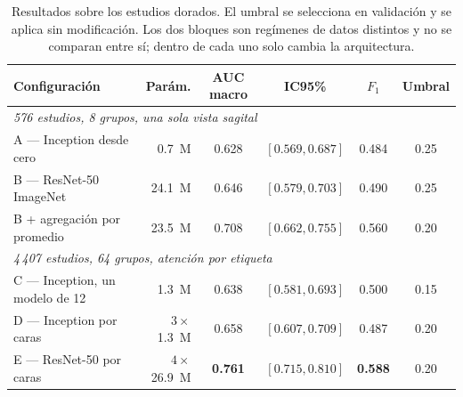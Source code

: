 \begin{table}[ht]
\centering
\caption{Resultados sobre los estudios dorados. El umbral se selecciona en
validación y se aplica sin modificación. Los dos bloques son regímenes de datos
distintos y no se comparan entre sí; dentro de cada uno solo cambia la
arquitectura.}
\label{tab:principal}
\begin{tabular}{lrcccc}
\toprule
Configuración & Parám. & AUC macro & IC95\% & $F_1$ & Umbral \\
\midrule
\multicolumn{6}{l}{\emph{576 estudios, 8 grupos, una sola vista sagital}} \\
A --- Inception desde cero & 0.7~M & 0.628 & $[0.569, 0.687]$ & 0.484 & 0.25 \\
B --- ResNet-50 ImageNet & 24.1~M & 0.646 & $[0.579, 0.703]$ & 0.490 & 0.25 \\
B + agregación por promedio & 23.5~M & 0.708 & $[0.662, 0.755]$ & 0.560 & 0.20 \\
\midrule
\multicolumn{6}{l}{\emph{4\,407 estudios, 64 grupos, atención por etiqueta}} \\
C --- Inception, un modelo de 12 & 1.3~M & 0.638 & $[0.581, 0.693]$ & 0.500 & 0.15 \\
D --- Inception por caras & $3\times$1.3~M & 0.658 & $[0.607, 0.709]$ & 0.487 & 0.20 \\
E --- ResNet-50 por caras & $4\times$26.9~M & \textbf{0.761} & $[0.715, 0.810]$ & \textbf{0.588} & 0.20 \\
\bottomrule
\end{tabular}
\end{table}
